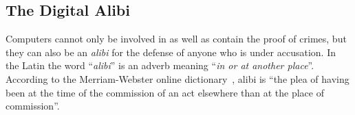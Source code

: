 \documentclass[runningheads]{llncs}
\begin{document}


\subsection{The Digital Alibi}
\label{sub:digital_alibi}

Computers cannot only be involved in as well as contain the proof of crimes, but they can also be an \emph{alibi} for the defense of anyone who is under accusation. In the Latin the word ``\emph{alibi}'' is an adverb meaning ``\emph{in or at another place}''.
According to the Merriam-Webster online dictionary~\cite{webster}, alibi is ``the plea of having been at the time of the commission of an act elsewhere than at the place of commission''.

\end{document}
